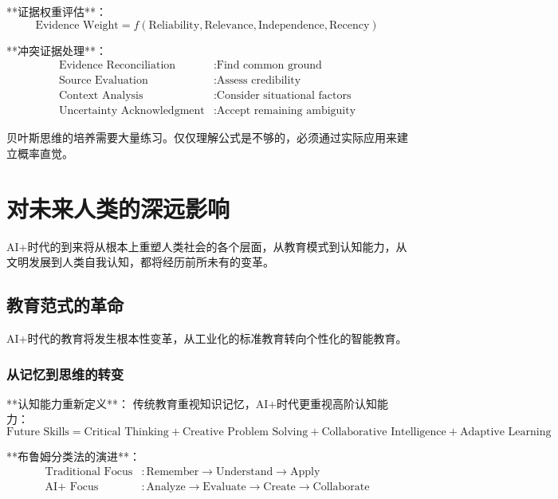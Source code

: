 **证据权重评估**：
\begin{equation}
\text{Evidence Weight} = f(\text{Reliability}, \text{Relevance}, \text{Independence}, \text{Recency})
\end{equation}

**冲突证据处理**：
\begin{align}
\text{Evidence Reconciliation} &: \text{Find common ground} \\
\text{Source Evaluation} &: \text{Assess credibility} \\
\text{Context Analysis} &: \text{Consider situational factors} \\
\text{Uncertainty Acknowledgment} &: \text{Accept remaining ambiguity}
\end{align}

\begin{center}
贝叶斯思维的培养需要大量练习。仅仅理解公式是不够的，必须通过实际应用来建立概率直觉。
\end{center}

\section{对未来人类的深远影响}

AI+时代的到来将从根本上重塑人类社会的各个层面，从教育模式到认知能力，从文明发展到人类自我认知，都将经历前所未有的变革。

\subsection{教育范式的革命}

AI+时代的教育将发生根本性变革，从工业化的标准教育转向个性化的智能教育。

\subsubsection{从记忆到思维的转变} %

**认知能力重新定义**：
传统教育重视知识记忆，AI+时代更重视高阶认知能力：
\begin{equation}
\text{Future Skills} = \text{Critical Thinking} + \text{Creative Problem Solving} + \text{Collaborative Intelligence} + \text{Adaptive Learning}
\end{equation}

**布鲁姆分类法的演进**：
\begin{align}
\text{Traditional Focus} &: \text{Remember} \rightarrow \text{Understand} \rightarrow \text{Apply} \\
\text{AI+ Focus} &: \text{Analyze} \rightarrow \text{Evaluate} \rightarrow \text{Create} \rightarrow \text{Collaborate}
\end{align}

